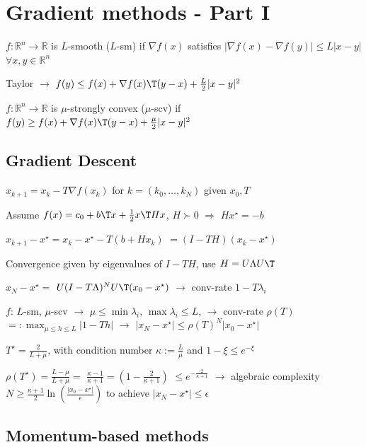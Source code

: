 
\section{Gradient methods - Part I}

\begin{definition}[smoothness]
	$f : \mathbb{R}^{n}\rightarrow \mathbb{R}$
	is $L$-smooth ($L$-sm) if
	$\nabla f(x)$
	satisfies
	$|\nabla f(x)-\nabla f(y)|\le L|x-y|$
	$\forall x,y \in \mathbb{R}^{n}$
\end{definition}
Taylor
$\rightarrow$
$f(y)\le f(x)+\nabla f(x)\T (y-x) +\frac{L}{2}|x-y|^2$

\begin{definition}
	$f : \mathbb{R}^{n}\rightarrow \mathbb{R}$
	is $\mu$-strongly convex ($\mu$-scv) if
	$f(y)\ge f(x)+\nabla f(x)\T(y-x)+\frac{\mu}{2}|x-y|^2$
\end{definition}

\subsection{Gradient Descent}

$x_{k+1}=x_k-T\nabla f(x_k)$
for
$k = (k_0,\dots,k_N)$
given
$x_0,T$


Assume
$f(x)=c_0+b\T x+\frac{1}{2}x\T Hx$,
$H\succ0$
$\Rightarrow$
$Hx^\star =-b$

$x_{k+1}-x^\star=x_k-x^\star-T(b+Hx_k)$
$=(I-TH)(x_k-x^\star)$

Convergence given by eigenvalues of $I-TH$,
use $H=U\Lambda U\T$

$x_{N}-x^\star=$
$U(I-T\Lambda)^N U\T(x_0-x^\star)$
$\rightarrow$
conv-rate $1-T\lambda_i$

$f$: $L$-sm, $\mu$-scv
$\rightarrow$
$\mu\le\operatorname{min}\lambda_i$,
$\operatorname{max}\lambda_i\le L$,
$\rightarrow$
conv-rate
$\rho(T)$
$=:\operatorname{max}_{\mu\le h\le L}|1-Th|$
$\rightarrow$
$|x_{N}-x^\star|\le\rho(T)^N|x_{0}-x^\star|$

$T^\star=\frac{2}{L+\mu}$,
with condition number
$\kappa:=\frac{L}{\mu}$
and
$1-\xi\le e^{-\xi}$

$\rho(T^\star)=\frac{L-\mu}{L+\mu}=$
$\frac{\kappa-1}{\kappa+1}=(1-\frac{2}{\kappa+1})$
$\le e^{-\frac{2}{\kappa+1}}$
$\rightarrow$
algebraic complexity
$N\ge\frac{\kappa+1}{2}\operatorname{ln}(\frac{|x_{0}-x^\star|}{\epsilon})$
to achieve
$|x_{N}-x^\star|\le\epsilon$

\subsection{Momentum-based methods}

